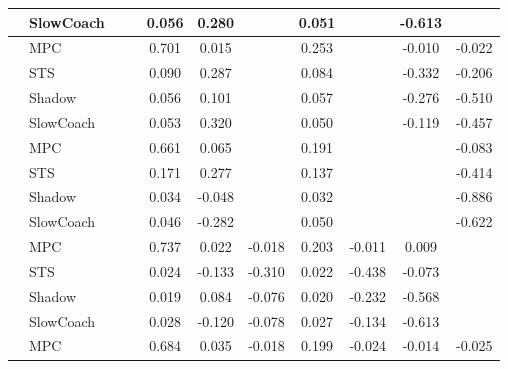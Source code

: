 \begin{tabular}{|l|l|*{9}{c|}}
                                                           & SlowCoach &       &        &     0.056 &  0.280 &     &  0.051 &      &  -0.613 &       \\
\midrule
[False, False, True, True, False, True, False, True, True] & MPC &       &        &     0.701 &  0.015 &     &  0.253 &      &  -0.010 &   -0.022 \\
                                                           & STS &       &        &     0.090 &  0.287 &     &  0.084 &      &  -0.332 &   -0.206 \\
                                                           & Shadow &       &        &     0.056 &  0.101 &     &  0.057 &      &  -0.276 &   -0.510 \\
                                                           & SlowCoach &       &        &     0.053 &  0.320 &     &  0.050 &      &  -0.119 &   -0.457 \\
\midrule
[False, False, True, True, False, True, False, False, True] & MPC &       &        &     0.661 &  0.065 &     &  0.191 &      &      &   -0.083 \\
                                                           & STS &       &        &     0.171 &  0.277 &     &  0.137 &      &      &   -0.414 \\
                                                           & Shadow &       &        &     0.034 & -0.048 &     &  0.032 &      &      &   -0.886 \\
                                                           & SlowCoach &       &        &     0.046 & -0.282 &     &  0.050 &      &      &   -0.622 \\
\midrule
[False, False, True, True, True, True, True, True, False] & MPC &       &        &     0.737 &  0.022 & -0.018 &  0.203 &  -0.011 &   0.009 &       \\
                                                           & STS &       &        &     0.024 & -0.133 & -0.310 &  0.022 &  -0.438 &  -0.073 &       \\
                                                           & Shadow &       &        &     0.019 &  0.084 & -0.076 &  0.020 &  -0.232 &  -0.568 &       \\
                                                           & SlowCoach &       &        &     0.028 & -0.120 & -0.078 &  0.027 &  -0.134 &  -0.613 &       \\
\midrule
[False, False, True, True, True, True, True, True, True] & MPC &       &        &     0.684 &  0.035 & -0.018 &  0.199 &  -0.024 &  -0.014 &   -0.025 \\

\end{tabular}
